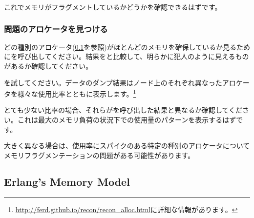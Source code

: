これでメモリがフラグメントしているかどうかを確認できるはずです。

\subsubsection{問題のアロケータを見つける}

どの種別のアロケータ(\ref{subsec:erlang-memory-model}を参照)がほとんどのメモリを確保しているか見るためにを呼び出してください。結果をと比較して、明らかに犯人のように見えるものがあるか確認してください。

を試してください。データのダンプ結果はノード上のそれぞれ異なったアロケータを様々な使用比率とともに表示します。\footnote{\href{http://ferd.github.io/recon/recon\_alloc.html}{http://ferd.github.io/recon/recon\_alloc.html}に詳細な情報があります。}

とても少ない比率の場合、それらがを呼び出した結果と異なるか確認してください。これは最大のメモリ負荷の状況下での使用量のパターンを表示するはずです。

大きく異なる場合は、使用率にスパイクのある特定の種別のアロケータについてメモリフラグメンテーションの問題がある可能性があります。

\subsection{Erlang's Memory Model}
\label{subsec:erlang-memory-model}

